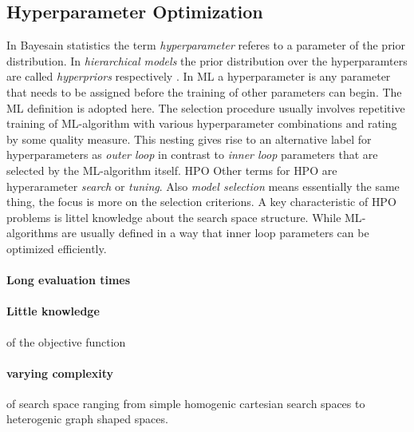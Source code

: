 \documentclass[english]{article}
\begin{document}
\subsection{Hyperparameter Optimization}
In Bayesain statistics the term \textit{hyperparameter} referes to a parameter of the prior distribution. In \textit{hierarchical models} the prior distribution over the hyperparamters are called \textit{hyperpriors} respectively \cite[p.408]{bishop_neural_1995}. In \acf{ML} a hyperparameter is any parameter that needs to be assigned before the training of other parameters can begin. The \ac{ML} definition is adopted here. The selection procedure usually involves repetitive training of \ac{ML}-algorithm with various hyperparameter combinations and rating by some quality measure. This nesting gives rise to an alternative label for hyperparameters as \textit{outer loop} in contrast to \textit{inner loop} parameters that are selected by the \ac{ML}-algorithm itself. \acf{HPO} Other terms for \ac{HPO} are hyperarameter \textit{search} or \textit{tuning}.
Also \textit{model selection} means essentially the same thing, the focus is more on the selection criterions.
A key characteristic of \ac{HPO} problems is littel knowledge about the search space structure.  While \ac{ML}-algorithms are usually defined in a way that inner loop parameters can be optimized efficiently.
\paragraph{Long evaluation times}
\paragraph{Little knowledge} of the objective function
\paragraph{varying complexity} of search space ranging from simple homogenic cartesian search spaces to heterogenic graph shaped spaces.
\end{document}
